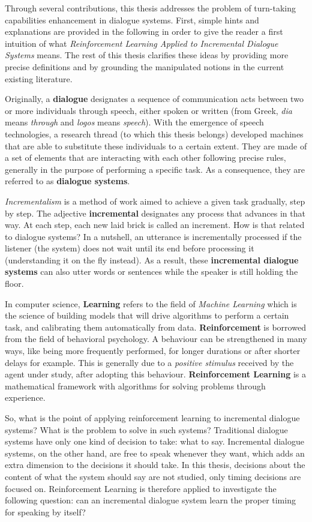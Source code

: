 				Through several contributions, this thesis addresses the problem of turn-taking capabilities enhancement in dialogue systems. First, simple hints and explanations are provided in the following in order to give the reader a first intuition of what \textit{Reinforcement Learning Applied to Incremental Dialogue Systems} means. The rest of this thesis clarifies these ideas by providing more precise definitions and by grounding the manipulated notions in the current existing literature.

        Originally, a \textbf{dialogue} designates a sequence of communication acts between two or more individuals through speech, either spoken or written (from Greek, \textit{dia} means \textit{through} and \textit{logos} means \textit{speech}). With the emergence of speech technologies, a research thread (to which this thesis belongs) developed machines that are able to substitute these individuals to a certain extent. They are made of a set of elements that are interacting with each other following precise rules, generally in the purpose of performing a specific task. As a consequence, they are referred to as \textbf{dialogue systems}.

        \textit{Incrementalism} is a method of work aimed to achieve a given task gradually, step by step. The adjective \textbf{incremental} designates any process that advances in that way. At each step, each new laid brick is called an increment. How is that related to dialogue systems? In a nutshell, an utterance is incrementally processed if the listener (the system) does not wait until its end before processing it (understanding it on the fly instead). As a result, these \textbf{incremental dialogue systems} can also utter words or sentences while the speaker is still holding the floor.

        In computer science, \textbf{Learning} refers to the field of \textit{Machine Learning} which is the science of building models that will drive algorithms to perform a certain task, and calibrating them automatically from data. \textbf{Reinforcement} is borrowed from the field of behavioral psychology. A behaviour can be strengthened in many ways, like being more frequently performed, for longer durations or after shorter delays for example. This is generally due to a \textit{positive stimulus} received by the agent under study, after adopting this behaviour. \textbf{Reinforcement Learning} is a mathematical framework with algorithms for solving problems through experience.

        So, what is the point of applying reinforcement learning to incremental dialogue systems? What is the problem to solve in such systems? Traditional dialogue systems have only one kind of decision to take: what to say. Incremental dialogue systems, on the other hand, are free to speak whenever they want, which adds an extra dimension to the decisions it should take. In this thesis, decisions about the content of what the system should say are not studied, only timing decisions are focused on. Reinforcement Learning is therefore applied to investigate the following question: can an incremental dialogue system learn the proper timing for speaking by itself?
				
